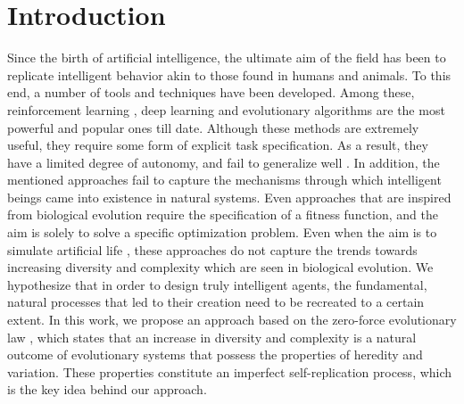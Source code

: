 \section{Introduction}

Since the birth of artificial intelligence, the ultimate aim of the field has been to replicate intelligent behavior akin to those found in humans and animals. To this end, a number of tools and techniques have been developed. Among these, reinforcement learning \cite{sutton1998reinforcement}, deep learning \cite{lecun2015deep} and evolutionary algorithms \cite{koza1994genetic,holland1992adaptation} are the most powerful and popular ones till date. Although these methods are extremely useful, they require some form of explicit task specification. As a result, they have a limited degree of autonomy, and fail to generalize well \cite{narodytska2016simple,taylor2009transfer}. In addition, the mentioned approaches fail to capture the mechanisms through which intelligent beings came into existence in natural systems. Even approaches that are inspired from biological evolution require the specification of a fitness function, and the aim is solely to solve a specific optimization problem. Even when the aim is to simulate artificial life \cite{sims1994evolving,nolfi2016evolutionary}, these approaches do not capture the trends towards increasing diversity and complexity which are seen in biological evolution.  
We hypothesize that in order to design truly intelligent agents, the fundamental, natural processes that led to their creation need to be recreated to a certain extent. In this work, we propose an approach based on the zero-force evolutionary law \cite{mcshea2010biology}, which states that an increase in diversity and complexity is a natural outcome of evolutionary systems that possess the properties of heredity and variation. 
These properties constitute an imperfect self-replication process, which is the key idea behind our approach. %

